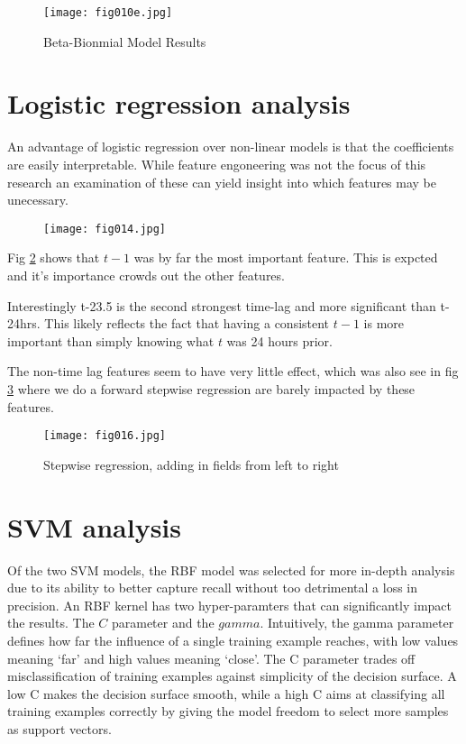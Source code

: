 \begin{figure}[h!]
	\centering
	\texttt{[image: fig010e.jpg]}
	\caption{Beta-Bionmial Model Results}
	\label{fig10e}
\end{figure} 

\section{Logistic regression analysis}

An advantage of logistic regression over non-linear models is that the coefficients are easily interpretable. While feature engoneering was not the focus of this research an examination of these can yield insight into which features may be unecessary. 

\begin{figure}[h!]
	\centering
	\texttt{[image: fig014.jpg]}
	\caption{}
	\label{fig14}
\end{figure} 

Fig \ref{fig14} shows that $t-1$ was by far the most important feature. This is expcted and it's importance crowds out the other features.

Interestingly t-23.5 is the second strongest time-lag and more significant than t-24hrs. This likely reflects the fact that having a consistent $t-1$ is more important than simply knowing what $t$ was 24 hours prior.

The non-time lag features seem to have very little effect, which was also see in fig \ref{fig16} where we do a forward stepwise regression are barely impacted by these features.

\begin{figure}[h!]
	\centering
	\texttt{[image: fig016.jpg]}
	\caption{Stepwise regression, adding in fields from left to right}
	\label{fig16}
\end{figure} 

\section{SVM analysis}

Of the two SVM models, the RBF model was selected for more in-depth analysis due to its ability to better capture recall without too detrimental a loss in precision. An RBF kernel has two hyper-paramters that can significantly impact the results. The $C$ parameter and the $gamma$. Intuitively, the gamma parameter defines how far the influence of a single training example reaches, with low values meaning ‘far’ and high values meaning ‘close’. The C parameter trades off misclassification of training examples against simplicity of the decision surface. A low C makes the decision surface smooth, while a high C aims at classifying all training examples correctly by giving the model freedom to select more samples as support vectors.

